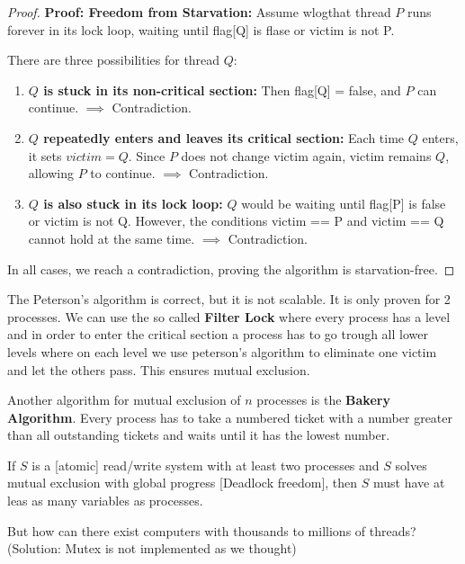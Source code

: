 \begin{proof}
\textbf{Proof: Freedom from Starvation:} Assume wlogthat thread $P$ runs forever in its lock loop, waiting until flag[Q] is flase or victim is not P.

There are three possibilities for thread $Q$:
\begin{enumerate}
    \item \textbf{$Q$ is stuck in its non-critical section:} 
    Then flag[Q] = false, and $P$ can continue. $\implies$ Contradiction.
    
    \item \textbf{$Q$ repeatedly enters and leaves its critical section:} 
    Each time $Q$ enters, it sets $victim = Q$. Since $P$ does not change victim again, victim remains $Q$, allowing $P$ to continue. $\implies$ Contradiction.
    
    \item \textbf{$Q$ is also stuck in its lock loop:} 
    $Q$ would be waiting until flag[P] is false or victim is not Q. However, the conditions victim == P and victim == Q cannot hold at the same time. $\implies$ Contradiction.
\end{enumerate}
In all cases, we reach a contradiction, proving the algorithm is starvation-free.
\end{proof}

\begin{remark}
    The Peterson's algorithm is correct, but it is not scalable. It is only proven for 2 processes. We can use the so called \textbf{Filter Lock} where every process has a level and in order to enter the critical section a process has to go trough all lower levels where on each level we use peterson's algorithm to eliminate one victim and let the others pass. This ensures mutual exclusion.
\end{remark}

\begin{remark}
    Another algorithm for mutual exclusion of $n$ processes is the \textbf{Bakery Algorithm}. Every process has to take a numbered ticket with a number greater than all outstanding tickets and waits until it has the lowest number.
\end{remark}

\begin{theorem}
    If $S$ is a [atomic] read/write system with at least two processes and $S$ solves mutual exclusion with global progress [Deadlock freedom], then $S$ must have at leas as many variables as processes.
\end{theorem}

\begin{remark}
    But how can there exist computers with thousands to millions of threads? (Solution: Mutex is not implemented as we thought)
\end{remark}
